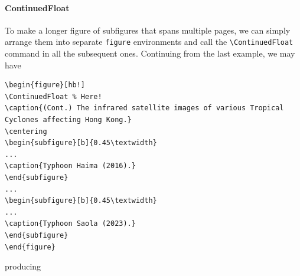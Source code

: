 \paragraph{ContinuedFloat} To make a longer figure of subfigures that spans multiple pages, we can simply arrange them into separate \verb|figure| environments and call the \texttt{\textbackslash ContinuedFloat} command in all the subsequent ones. Continuing from the last example, we may have
\begin{lstlisting}
\begin{figure}[hb!]
\ContinuedFloat % Here!
\caption{(Cont.) The infrared satellite images of various Tropical Cyclones affecting Hong Kong.}
\centering
\begin{subfigure}[b]{0.45\textwidth}
...
\caption{Typhoon Haima (2016).}
\end{subfigure}
...
\begin{subfigure}[b]{0.45\textwidth}
...
\caption{Typhoon Saola (2023).}
\end{subfigure}
\end{figure}    
\end{lstlisting}
producing
